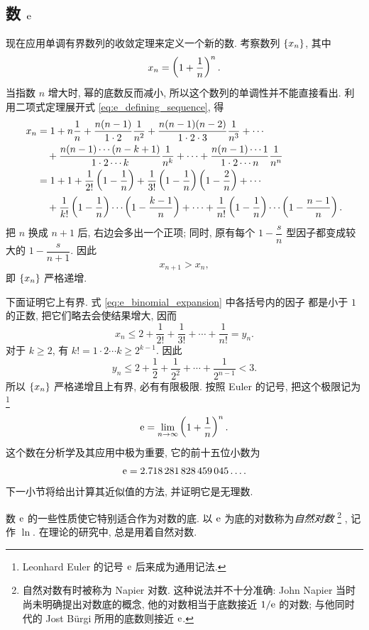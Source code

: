 \subsection{数 \texorpdfstring{$\mathrm{e}$}{e}}\label{subsec:36}
现在应用单调有界数列的收敛定理来定义一个新的数.
考察数列 $\{x_{n}\}$, 其中
\begin{equation}\label{eq:e_defining_sequence}
x_n=\left( 1+\frac1n \right)^n.
\end{equation}
当指数 $n$ 增大时, 幂的底数反而减小, 所以这个数列的单调性并不能直接看出.
利用二项式定理展开式 \eqref{eq:e_defining_sequence}, 得
\begin{equation}\label{eq:e_binomial_expansion}
\begin{aligned}
x_n
&=1+n\frac1n+\frac{n(n-1)}{1\cdot2}\frac1{n^2}
 +\frac{n(n-1)(n-2)}{1\cdot2\cdot3}\frac1{n^3}+\cdots\\
&\quad+\frac{n(n-1)\cdots(n-k+1)}{1\cdot2\cdots k}\frac1{n^k}
 +\cdots+\frac{n(n-1)\cdots1}{1\cdot2\cdots n}\frac1{n^n}\\
&=1+1+\frac1{2!}\left( 1-\frac1n \right)
 +\frac1{3!}\left( 1-\frac1n \right)\left( 1-\frac2n \right)+\cdots\\
&\quad+\frac1{k!}\left( 1-\frac1n \right)\cdots\left( 1-\frac{k-1}{n} \right)
 +\cdots+\frac1{n!}\left( 1-\frac1n \right)\cdots\left( 1-\frac{n-1}{n} \right).
\end{aligned}
\end{equation}
把 $n$ 换成 $n+1$ 后, 右边会多出一个正项;
同时, 原有每个 $1-\dfrac{s}{n}$ 型因子都变成较大的
$1-\dfrac{s}{n+1}$. 因此
$$
x_{n+1}>x_n,
$$
即 $\{x_{n}\}$ 严格递增.

下面证明它上有界. 式 \eqref{eq:e_binomial_expansion} 中各括号内的因子
都是小于 $1$ 的正数, 把它们略去会使结果增大, 因而
$$
x_n\leqslant2+\frac1{2!}+\frac1{3!}+\cdots+\frac1{n!}=y_n.
$$
对于 $k\geqslant2$, 有 $k!=1\cdot2\cdots k\geqslant2^{k-1}$. 因此
$$
y_n\leqslant2+\frac12+\frac1{2^2}+\cdots+\frac1{2^{n-1}}<3.
$$
所以 $\{x_{n}\}$ 严格递增且上有界, 必有有限极限. 按照 Euler 的记号,
把这个极限记为\footnote{Leonhard Euler 的记号 $\mathrm{e}$ 后来成为通用记法.}
$$
\mathrm{e}=\lim\limits_{n \to \infty}\left( 1+\frac1n \right)^n.
$$
这个数在分析学及其应用中极为重要, 它的前十五位小数为
$$
\mathrm{e}=2.718\,281\,828\,459\,045\ldots.
$$
下一小节将给出计算其近似值的方法, 并证明它是无理数.

数 $\mathrm{e}$ 的一些性质使它特别适合作为对数的底. 以 $\mathrm{e}$ 为底的对数称为\emph{自然对数}
\footnote{自然对数有时被称为 Napier 对数. 这种说法并不十分准确:
John Napier 当时尚未明确提出对数底的概念, 他的对数相当于底数接近 $1/\mathrm{e}$ 的对数;
与他同时代的 Jost B\"urgi 所用的底数则接近 $\mathrm{e}$.}
, 记作 $\ln$.
在理论的研究中, 总是用着自然对数.

